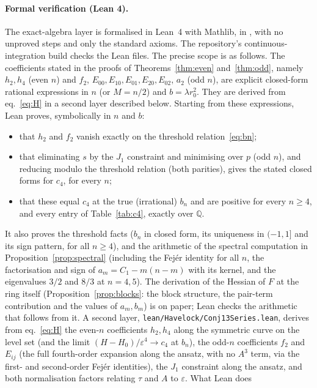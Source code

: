 \documentclass[11pt]{article}
\theoremstyle{definition}
\theoremstyle{remark}
\newcommand{\code}[1]{\path{#1}}
\begin{document}
\paragraph{Formal verification (Lean 4).} The exact-algebra layer is formalised in Lean~4 with Mathlib,
in \code{lean/Havelock/Conj13Algebra.lean}, with no unproved steps and only the standard axioms. The
repository's continuous-integration build checks the Lean files. The precise scope is as follows. The
coefficients stated in the proofs of Theorems~\ref{thm:even} and~\ref{thm:odd}, namely $h_2,h_4$ (even $n$)
and $f_2$, $E_{00},E_{10},E_{01},E_{20},E_{02}$, $a_2$ (odd $n$), are explicit closed-form rational
expressions in $n$ (or $M=n/2$) and $b=\lambda r_0^2$. They are derived from eq.~\eqref{eq:H} in a second
layer described below. Starting from these expressions, Lean proves, symbolically in $n$ and $b$:
\begin{itemize}
\item that $h_2$ and $f_2$ vanish exactly on the threshold relation~\eqref{eq:bn};
\item that eliminating $s$ by the $J_1$ constraint and minimising over $p$ (odd $n$), and reducing modulo the
threshold relation (both parities), gives the stated closed forms for $c_4$, for every $n$;
\item that these equal $c_4$ at the true (irrational) $b_n$ and are positive for every $n\ge4$, and every entry
of Table~\ref{tab:c4}, exactly over $\mathbb Q$.
\end{itemize}
It also proves the threshold facts ($b_n$ in closed form, its uniqueness in $(-1,1]$ and its sign pattern,
for all $n\ge4$), and the arithmetic of the spectral computation in Proposition~\ref{prop:spectral}
(including the Fej\'er identity for all $n$, the factorisation and sign of $a_m=C_1-m(n-m)$ with its
kernel, and the eigenvalues $3/2$ and $8/3$ at $n=4,5$). The derivation of the Hessian of $F$ at the ring
itself (Proposition~\ref{prop:blocks}: the block structure, the pair-term contribution and the values of
$a_m,b_m$) is on paper; Lean checks the arithmetic that follows from it. A second layer, \texttt{lean/Havelock/Conj13Series.lean},
derives from eq.~\eqref{eq:H} the even-$n$ coefficients $h_2,h_4$ along the symmetric curve on the level set (and the
limit $(H-H_0)/\varepsilon^4\to c_4$ at $b_n$), the odd-$n$ coefficients $f_2$ and $E_{ij}$ (the full fourth-order
expansion along the ansatz, with no $A^3$ term, via the first- and second-order Fej\'er identities), the $J_1$
constraint along the ansatz, and both normalisation factors relating $\tau$ and $A$ to $\varepsilon$. What Lean does
\end{document}
